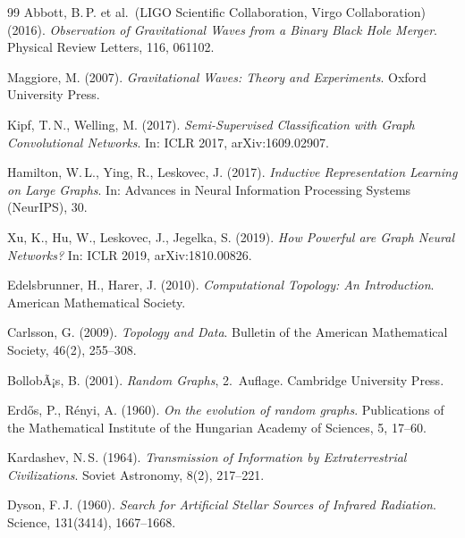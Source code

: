 ﻿\documentclass[a4paper,12pt]{report}
\theoremstyle{definition}
\begin{document}
\begin{thebibliography}{99}
Abbott, B.\,P. et al.\ (LIGO Scientific Collaboration, Virgo Collaboration) (2016). \textit{Observation of Gravitational Waves from a Binary Black Hole Merger}. Physical Review Letters, 116, 061102.

Maggiore, M. (2007). \textit{Gravitational Waves: Theory and Experiments}. Oxford University Press.


Kipf, T.\,N., Welling, M. (2017). \textit{Semi-Supervised Classification with Graph Convolutional Networks}. In: ICLR 2017, arXiv:1609.02907.

Hamilton, W.\,L., Ying, R., Leskovec, J. (2017). \textit{Inductive Representation Learning on Large Graphs}. In: Advances in Neural Information Processing Systems (NeurIPS), 30.

Xu, K., Hu, W., Leskovec, J., Jegelka, S. (2019). \textit{How Powerful are Graph Neural Networks?} In: ICLR 2019, arXiv:1810.00826.


Edelsbrunner, H., Harer, J. (2010). \textit{Computational Topology: An Introduction}. American Mathematical Society.

Carlsson, G. (2009). \textit{Topology and Data}. Bulletin of the American Mathematical Society, 46(2), 255--308.


BollobÃ¡s, B. (2001). \textit{Random Graphs}, 2.\ Auflage. Cambridge University Press.

Erd\H{o}s, P., Rényi, A. (1960). \textit{On the evolution of random graphs}. Publications of the Mathematical Institute of the Hungarian Academy of Sciences, 5, 17--60.


Kardashev, N.\,S. (1964). \textit{Transmission of Information by Extraterrestrial Civilizations}. Soviet Astronomy, 8(2), 217--221.

Dyson, F.\,J. (1960). \textit{Search for Artificial Stellar Sources of Infrared Radiation}. Science, 131(3414), 1667--1668.



\end{thebibliography}
\end{document}
